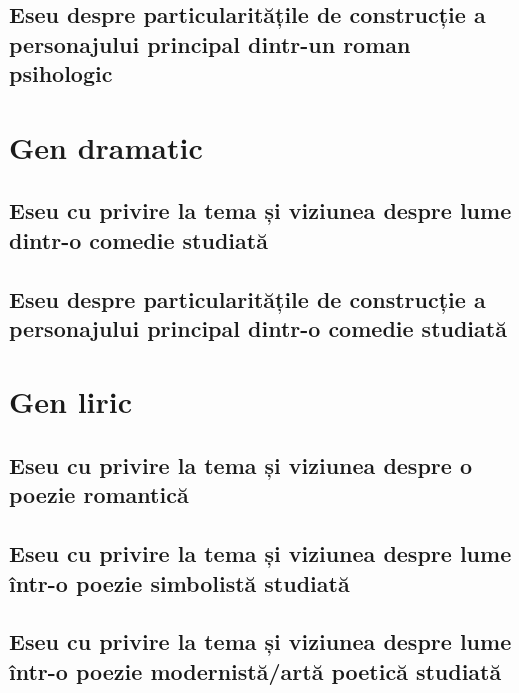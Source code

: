 \documentclass[
 12pt,                       %
 a4paper                     %
]{book}
\begin{document}
\chapter{Eseu despre particularitățile de construcție a personajului principal dintr-un roman psihologic}




\part{Gen dramatic}


\chapter{Eseu cu privire la tema și viziunea despre lume dintr-o comedie studiată}


\chapter{Eseu despre particularitățile de construcție a personajului principal dintr-o comedie studiată}




\part{Gen liric}


\chapter{Eseu cu privire la tema și viziunea despre o poezie romantică}



\chapter{Eseu cu privire la tema și viziunea despre lume într-o poezie simbolistă studiată}



\chapter{Eseu cu privire la tema și viziunea despre lume într-o poezie modernistă/artă poetică studiată}

\end{document}
